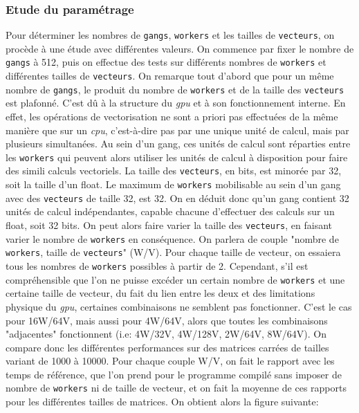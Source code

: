 \documentclass{article}
\begin{document}
\subsubsection{Etude du paramétrage}

Pour déterminer les nombres de \texttt{gangs}, \texttt{workers} et les tailles de \texttt{vecteurs}, on procède à une étude avec différentes valeurs. On commence par fixer le nombre de \texttt{gangs} à 512, puis on effectue des tests sur différents nombres de \texttt{workers} et différentes tailles de \texttt{vecteurs}. On remarque tout d'abord que pour un même nombre de \texttt{gangs}, le produit du nombre de \texttt{workers} et de la taille des \texttt{vecteurs} est plafonné. C'est dû à la structure du \textit{\gls{gpu}} et à son fonctionnement interne. En effet, les opérations de vectorisation ne sont a priori pas effectuées de la même manière que sur un \textit{\gls{cpu}}, c'est-à-dire pas par une unique unité de calcul, mais par plusieurs simultanées. Au sein d'un gang, ces unités de calcul sont réparties entre les \texttt{workers} qui peuvent alors utiliser les unités de calcul à disposition pour faire des simili calculs vectoriels. La taille des \texttt{vecteurs}, en bits, est minorée par 32, soit la taille d'un float. Le maximum de \texttt{workers} mobilisable au sein d'un gang avec des \texttt{vecteurs} de taille 32, est 32. On en déduit donc qu'un gang contient 32 unités de calcul indépendantes, capable chacune d'effectuer des calculs sur un float, soit 32 bits. On peut alors faire varier la taille des \texttt{vecteurs}, en faisant varier le nombre de \texttt{workers} en conséquence. On parlera de couple "nombre de \texttt{workers}, taille de \texttt{vecteurs}" (W/V). Pour chaque taille de vecteur, on essaiera tous les nombres de \texttt{workers} possibles à partir de 2. Cependant, s'il est compréhensible que l'on ne puisse excéder un certain nombre de \texttt{workers} et une certaine taille de vecteur, du fait du lien entre les deux et des limitations physique du \textit{\gls{gpu}}, certaines combinaisons ne semblent pas fonctionner. C'est le cas pour 16W/64V, mais aussi pour 4W/64V, alors que toutes les combinaisons "adjacentes" fonctionnent (i.e: 4W/32V, 4W/128V, 2W/64V, 8W/64V). On compare donc les différentes performances sur des matrices carrées de tailles variant de 1000 à 10000. Pour chaque couple W/V, on fait le rapport avec les temps de référence, que l'on prend pour le programme compilé sans imposer de nombre de \texttt{workers} ni de taille de vecteur, et on fait la moyenne de ces rapports pour les différentes tailles de matrices. On obtient alors la figure suivante:
\end{document}
